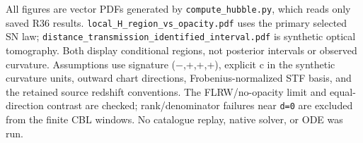 \documentclass[
]{article}
\begin{document}
All figures are vector PDFs generated by \texttt{compute\_hubble.py},
which reads only saved R36 results.
\texttt{local\_H\_region\_vs\_opacity.pdf} uses the primary selected SN
law; \texttt{distance\_\allowbreak{}transmission\_\allowbreak{}identified\_\allowbreak{}interval.pdf} is
synthetic optical tomography. Both display conditional regions, not
posterior intervals or observed curvature. Assumptions use signature
(−,+,+,+), explicit c in the synthetic curvature units, outward chart
directions, Frobenius-normalized STF basis, and the retained source
redshift conventions. The FLRW/no-opacity limit and equal-direction
contrast are checked; rank/denominator failures near \texttt{d=0} are
excluded from the finite CBL windows. No catalogue replay, native
solver, or ODE was run.
\end{document}
